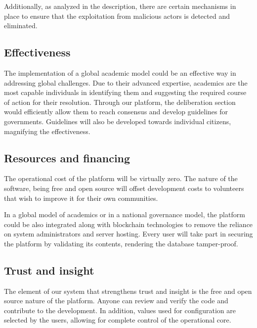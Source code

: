 \documentclass[a4paper,11pt]{article}
\begin{document}
\begin{multicols}{2}
Additionally, as analyzed in the description, there are certain mechanisms in place to ensure that the exploitation from malicious actors is detected and eliminated.

\begin{figure}[hb]
\centering
\resizebox{30mm}{!}{}
\label{TDFlogo}
\end{figure}

\subsection{Effectiveness} \label{effectiveness}

The implementation of a global academic model could be an effective way in addressing global challenges. Due to their advanced expertise, academics are the most capable individuals in identifying them and suggesting the required course of action for their resolution. Through our platform, the deliberation section would efficiently allow them to reach consensus and develop guidelines for governments. Guidelines will also be developed towards individual citizens, magnifying the effectiveness.

\subsection{Resources and financing} \label{resources}

The operational cost of the platform will be virtually zero. The nature of the software, being free and open source will offset development costs to volunteers that wish to improve it for their own communities.

In a global model of academics or in a national governance model, the platform could be also integrated along with blockchain technologies to remove the reliance on system administrators and server hosting. Every user will take part in securing the platform by validating its contents, rendering the database tamper-proof.

\subsection{Trust and insight} \label{trust}

The element of our system that strengthens trust and insight is the free and open source nature of the platform. Anyone can review and verify the code and contribute to the development. In addition, values used for configuration are selected by the users, allowing for complete control of the operational core.


\end{multicols}
\end{document}
